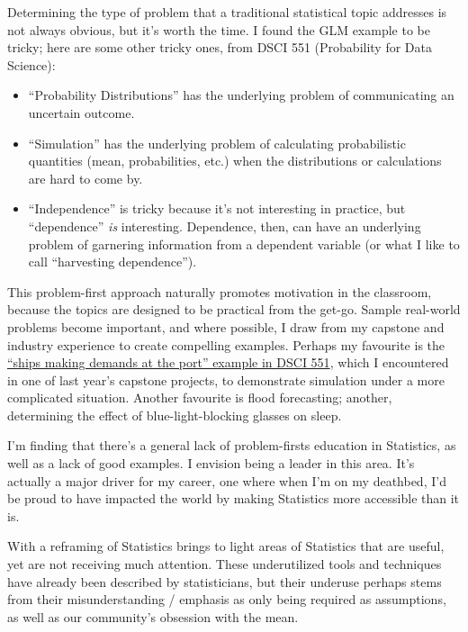 \documentclass[]{article}
\providecommand{\tightlist}{%
  \setlength{\itemsep}{0pt}\setlength{\parskip}{0pt}}
\begin{document}
Determining the type of problem that a traditional statistical topic addresses is not always obvious, but it's worth the time. I found the GLM example to be tricky; here are some other tricky ones, from DSCI 551 (Probability for Data Science):

\begin{itemize}
\tightlist
\item
  ``Probability Distributions'' has the underlying problem of communicating an uncertain outcome.
\item
  ``Simulation'' has the underlying problem of calculating probabilistic quantities (mean, probabilities, etc.) when the distributions or calculations are hard to come by.
\item
  ``Independence'' is tricky because it's not interesting in practice, but ``dependence'' \emph{is} interesting. Dependence, then, can have an underlying problem of garnering information from a dependent variable (or what I like to call ``harvesting dependence'').
\end{itemize}

This problem-first approach naturally promotes motivation in the classroom, because the topics are designed to be practical from the get-go. Sample real-world problems become important, and where possible, I draw from my capstone and industry experience to create compelling examples. Perhaps my favourite is the \href{https://ubc-mds.github.io/DSCI_551_stat-prob-dsci/lectures/simulation.html\#multi-step-simulations-10-min}{``ships making demands at the port'' example in DSCI 551}, which I encountered in one of last year's capstone projects, to demonstrate simulation under a more complicated situation. Another favourite is flood forecasting; another, determining the effect of blue-light-blocking glasses on sleep.

I'm finding that there's a general lack of problem-firsts education in Statistics, as well as a lack of good examples. I envision being a leader in this area. It's actually a major driver for my career, one where when I'm on my deathbed, I'd be proud to have impacted the world by making Statistics more accessible than it is.

With a reframing of Statistics brings to light areas of Statistics that are useful, yet are not receiving much attention. These underutilized tools and techniques have already been described by statisticians, but their underuse perhaps stems from their misunderstanding / emphasis as only being required as assumptions, as well as our community's obsession with the mean.
\end{document}
